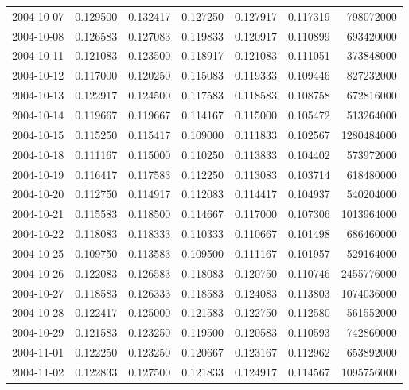 \begin{tabular}{lrrrrrr}
2004-10-07 &    0.129500 &    0.132417 &    0.127250 &    0.127917 &    0.117319 &   798072000 \\
2004-10-08 &    0.126583 &    0.127083 &    0.119833 &    0.120917 &    0.110899 &   693420000 \\
2004-10-11 &    0.121083 &    0.123500 &    0.118917 &    0.121083 &    0.111051 &   373848000 \\
2004-10-12 &    0.117000 &    0.120250 &    0.115083 &    0.119333 &    0.109446 &   827232000 \\
2004-10-13 &    0.122917 &    0.124500 &    0.117583 &    0.118583 &    0.108758 &   672816000 \\
2004-10-14 &    0.119667 &    0.119667 &    0.114167 &    0.115000 &    0.105472 &   513264000 \\
2004-10-15 &    0.115250 &    0.115417 &    0.109000 &    0.111833 &    0.102567 &  1280484000 \\
2004-10-18 &    0.111167 &    0.115000 &    0.110250 &    0.113833 &    0.104402 &   573972000 \\
2004-10-19 &    0.116417 &    0.117583 &    0.112250 &    0.113083 &    0.103714 &   618480000 \\
2004-10-20 &    0.112750 &    0.114917 &    0.112083 &    0.114417 &    0.104937 &   540204000 \\
2004-10-21 &    0.115583 &    0.118500 &    0.114667 &    0.117000 &    0.107306 &  1013964000 \\
2004-10-22 &    0.118083 &    0.118333 &    0.110333 &    0.110667 &    0.101498 &   686460000 \\
2004-10-25 &    0.109750 &    0.113583 &    0.109500 &    0.111167 &    0.101957 &   529164000 \\
2004-10-26 &    0.122083 &    0.126583 &    0.118083 &    0.120750 &    0.110746 &  2455776000 \\
2004-10-27 &    0.118583 &    0.126333 &    0.118583 &    0.124083 &    0.113803 &  1074036000 \\
2004-10-28 &    0.122417 &    0.125000 &    0.121583 &    0.122750 &    0.112580 &   561552000 \\
2004-10-29 &    0.121583 &    0.123250 &    0.119500 &    0.120583 &    0.110593 &   742860000 \\
2004-11-01 &    0.122250 &    0.123250 &    0.120667 &    0.123167 &    0.112962 &   653892000 \\
2004-11-02 &    0.122833 &    0.127500 &    0.121833 &    0.124917 &    0.114567 &  1095756000 \\

\end{tabular}
